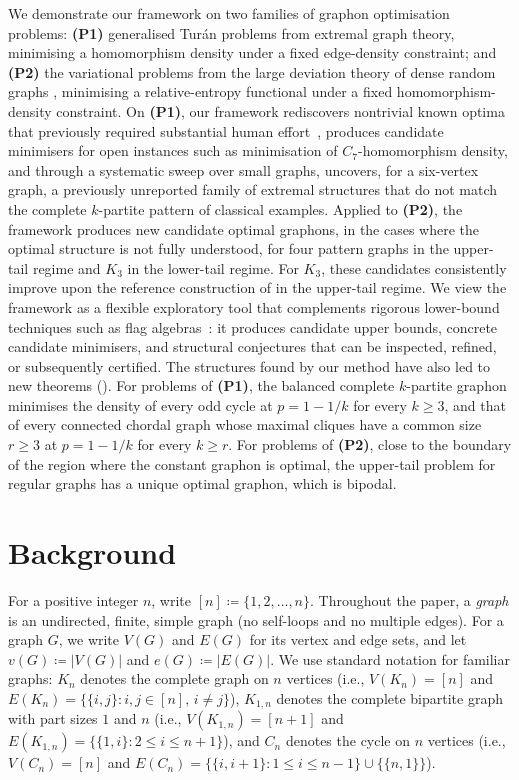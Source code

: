 \documentclass{article}
\theoremstyle{plain}
\theoremstyle{definition}
\theoremstyle{remark}
\begin{document}
We demonstrate our framework on two families of graphon optimisation problems: \textbf{(P1)} generalised Tur\'an problems from extremal graph theory, minimising a homomorphism density under a fixed edge-density constraint; and \textbf{(P2)} the variational problems from the large deviation theory of dense random graphs \citep{chatterjee2011large}, minimising a relative-entropy functional under a fixed homomorphism-density constraint.
On \textbf{(P1)}, our framework rediscovers nontrivial known optima that previously required substantial human effort~\citep{goodman1959sets,bollobas1976relations,lovasz1983number,fisher1989lower,razborov2008minimal}, produces candidate minimisers for open instances such as minimisation of $C_7$-homomorphism density, and through a systematic sweep over small graphs, uncovers, for a six-vertex graph, a previously unreported family of extremal structures that do not match the complete $k$-partite pattern of classical examples.
Applied to \textbf{(P2)}, the framework produces new candidate optimal graphons, in the cases where the optimal structure is not fully understood, for four pattern graphs in the upper-tail regime and $K_3$ in the lower-tail regime. For $K_3$, these candidates consistently improve upon the reference construction of \citet{lubetzky2015replica} in the upper-tail regime.
We view the framework as a flexible exploratory tool that complements rigorous lower-bound techniques such as flag algebras~\citep{razborov2007flag,falgas2013applications}: it produces candidate upper bounds, concrete candidate minimisers, and structural conjectures that can be inspected, refined, or subsequently certified. The structures found by our method have also led to new theorems (). For problems of \textbf{(P1)}, the balanced complete $k$-partite graphon minimises the density of every odd cycle at $p = 1 - 1/k$ for every $k \ge 3$, and that of every connected chordal graph whose maximal cliques have a common size $r \ge 3$ at $p = 1 - 1/k$ for every $k \ge r$. For problems of \textbf{(P2)}, close to the boundary of the region where the constant graphon is optimal, the upper-tail problem for regular graphs has a unique optimal graphon, which is bipodal.

\section{Background} \label{sec:background}

For a positive integer $n$, write $[n] \coloneqq \{1,2,\ldots,n\}$. Throughout the paper, a \emph{graph} is an undirected, finite, simple graph (no self-loops and no multiple edges). For a graph $G$, we write $V(G)$ and $E(G)$ for its vertex and edge sets, and let $v(G) \coloneqq |V(G)|$ and $e(G) \coloneqq |E(G)|$. We use standard notation for familiar graphs: $K_n$ denotes the complete graph on $n$ vertices (i.e., $V(K_n) = [n]$ and $E(K_n) = \{\{i,j\} : i, j \in [n],\, i \neq j\}$), $K_{1,n}$ denotes the complete bipartite graph with part sizes $1$ and $n$ (i.e., $V(K_{1,n}) = [n+1]$ and $E(K_{1,n}) = \{\{1,i\} : 2\le i\le n+1\}$), and $C_n$ denotes the cycle on $n$ vertices (i.e., $V(C_n) = [n]$ and $E(C_n) = \{\{i,i+1\} : 1\le i\le n-1\} \cup \{\{n,1\}\}$).
\end{document}
